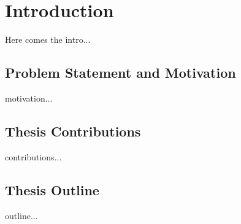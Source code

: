 \chapter{Introduction}

Here comes the intro... 

\section{Problem Statement and Motivation}
\label{sec:motivation}

motivation... 

\section{Thesis Contributions}
\label{sec:contribution}

contributions... 

\section{Thesis Outline}
\label{sec:outline}

outline... 

